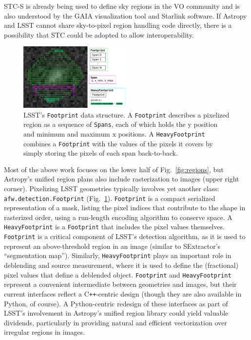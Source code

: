 \documentclass[]{spie}  %
\newcommand{\CPP}{C\texttt{++}\xspace}  %
\begin{document}
STC-S is already being used to define sky regions in the VO community and is also understood by the GAIA visualization tool\cite{2009ASPC..411..575D} and Starlink software\cite{2010ASPC..434..213B,2014ASPC..485..391C}.
If Astropy and LSST cannot share sky-to-pixel region handling code directly, there is a possibility that STC could be adopted to allow interoperability.

\begin{figure} [t]
\begin{center}
\includegraphics[width=0.5\textwidth]{footprint}
\end{center}
\caption[footprint]
{\label{fig:footprint}
LSST's \texttt{Footprint} data structure.
A \texttt{Footprint} describes a pixelized region as a sequence of \texttt{Spans}, each of which holds the y position and minimum and maximum x positions.
A \texttt{HeavyFootprint} combines a \texttt{Footprint} with the values of the pixels it covers by simply storing the pixels of each span back-to-back.}
\end{figure}

Most of the above work focuses on the lower half of Fig.~\ref{fig:regions}, but Astropy's unified region plans also include rasterization to images (upper right corner).
Pixelizing LSST geometries typically involves yet another class: \texttt{afw.detection.Footprint} (Fig.~\ref{fig:footprint}).
\texttt{Footprint} is a compact serialized representation of a mask, listing the pixel indices that contribute to the shape in rasterized order, using a run-length encoding algorithm to conserve space.
A \texttt{HeavyFootprint} is a \texttt{Footprint} that includes the pixel values themselves.
\texttt{Footprint} is a critical component of LSST's detection algorithm, as it is used to represent an above-threshold region in an image (similar to SExtractor's ``segmentation map'').
Similarly, \texttt{HeavyFootprint} plays an important role in deblending and source measurement, where it is used to define the (fractional) pixel values that define a deblended object.
\texttt{Footprint} and \texttt{HeavyFootprint} represent a convenient intermediate between geometries and images, but their current interfaces reflect a \CPP-centric design (though they are also available in Python, of course).
A Python-centric redesign of these interfaces as part of LSST's involvement in Astropy's unified region library could yield valuable dividends, particularly in providing natural and efficient vectorization over irregular regions in images.
\end{document}
